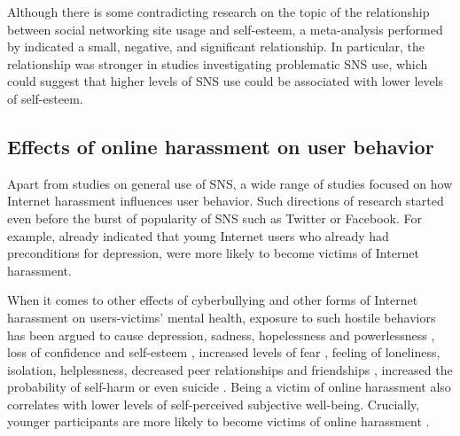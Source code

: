\documentclass[a4paper,fleqn]{cas-dc}
\begin{document}
Although there is some contradicting research on the topic of the relationship between social networking site usage and self-esteem, a meta-analysis performed by \citet{saiphoo2020social} indicated a small, negative, and significant relationship. In particular, the relationship was stronger in studies investigating problematic SNS use, which could suggest that higher levels of SNS use could be associated with lower levels of self-esteem.















\subsection{Effects of online harassment on user behavior}

Apart from studies on general use of SNS, a wide range of studies focused on how Internet harassment influences user behavior. Such directions of research started even before
the burst of popularity of SNS such as Twitter or Facebook. For example, \citet{ybarra2004linkages} already indicated that young Internet users who already had preconditions for 
depression,
were more likely to become victims of Internet harassment.

When it comes to other effects of cyberbullying and other forms of Internet harassment on users-victims' mental health, exposure to such hostile behaviors has been argued to cause depression, sadness, hopelessness and powerlessness \citep{raskauskas2007involvement}, loss of confidence and self-esteem \citep{cross2012virtual}, increased levels of fear  \citep{sourander2010psychosocial}, feeling of loneliness, isolation, helplessness, decreased peer relationships and friendships \citep{nixon2014current}, increased the probability of  self-harm or even suicide \citep{cross2012virtual}.
Being a victim of online harassment also correlates with lower levels of self-perceived subjective well-being. Crucially, younger participants are more likely to become victims of online harassment \citep{nasi2014association}.
\end{document}
